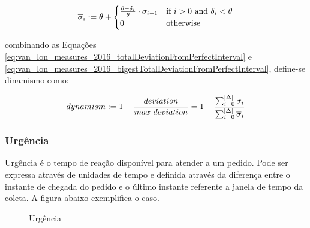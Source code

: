 \documentclass{anpet}
\begin{document}
\begin{equation}
    \overline{\sigma}_i := \theta + 
        \begin{cases}
            \frac{\theta - \delta_i} {\theta} \cdot \sigma_{i-1} & \text{if $i>0$ and $\delta_i < \theta$} \\
            0 & \text{otherwise}
        \end{cases}
    \label{eq:van_lon_measures_2016_bigestDeviationFromPerfectInterval}    
\end{equation}

combinando as Equações \ref{eq:van_lon_measures_2016_totalDeviationFromPerfectInterval} e \ref{eq:van_lon_measures_2016_bigestTotalDeviationFromPerfectInterval}, define-se dinamismo como:

\begin{equation}
    dynamism := 1 - \frac{deviation}{max\text{ }deviation} = 1 - \frac{\sum_{i=0}^{|\Delta|} \sigma_i}{\sum_{i=0}^{|\Delta|} \overline{\sigma}_i}
    \label{eq:van_lon_measures_2016_dynamism}
\end{equation}

\subsubsection{Urgência} 

Urgência é o tempo de reação disponível para atender a um pedido. Pode ser expressa através de unidades de tempo e definida através da diferença entre o instante de chegada do pedido e o último instante referente a janela de tempo da coleta. A figura abaixo exemplifica o caso.

\begin{figure}[H]
    \begin{center}
        \caption{Urgência}
        \label{fig:van_lon_measures_2016_urgency}
    \end{center} 
\end{figure}
\end{document}
